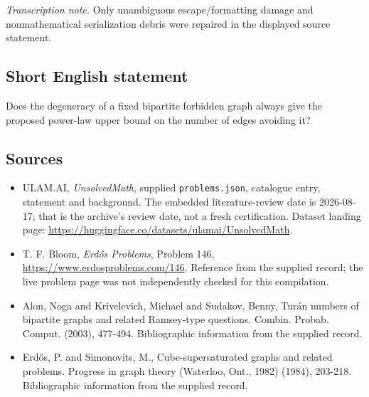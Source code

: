 \documentclass[11pt,a4paper]{article}
\begin{document}
{\small\emph{Transcription note.} Only unambiguous escape/formatting damage and nonmathematical serialization debris were repaired in the displayed source statement.}

\subsection{Short English statement}

Does the degeneracy of a fixed bipartite forbidden graph always give the proposed power-law upper bound on the number of edges avoiding it?

\subsection{Sources}

{\small

\begin{itemize}

\item[\hypertarget{source:statement:1}{S1}] ULAM.AI, \emph{UnsolvedMath}, supplied \texttt{problems.json}, catalogue entry, statement and background. The embedded literature-review date is 2026-08-17; that is the archive’s review date, not a fresh certification. Dataset landing page: \url{https://huggingface.co/datasets/ulamai/UnsolvedMath}.

\item[\hypertarget{source:statement:2}{S2}] T. F. Bloom, \emph{Erdős Problems}, Problem 146, \url{https://www.erdosproblems.com/146}. Reference from the supplied record; the live problem page was not independently checked for this compilation.

\item[\hypertarget{source:statement:3}{S3}] Alon, Noga and Krivelevich, Michael and Sudakov, Benny, Tur\'{a}n numbers of bipartite graphs and related Ramsey-type questions. Combin. Probab. Comput. (2003), 477-494. Bibliographic information from the supplied record.

\item[\hypertarget{source:statement:4}{S4}] Erd\H{o}s, P. and Simonovits, M., Cube-supersaturated graphs and related problems. Progress in graph theory (Waterloo, Ont., 1982) (1984), 203-218. Bibliographic information from the supplied record.

\end{itemize}

}

\label{end:statement}
\end{document}
